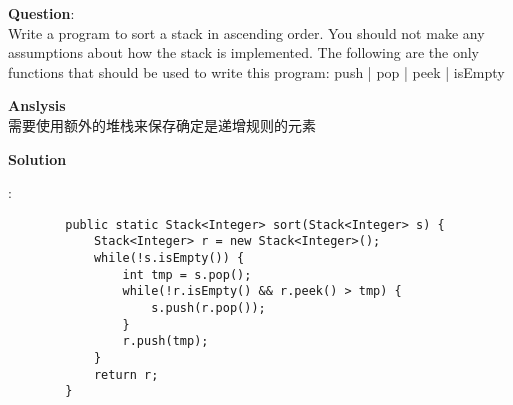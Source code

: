     
\begin{description}
    \item{\textbf{Question}}:\\%
		Write a program to sort a stack in ascending order. You should not make any assumptions about how the stack is implemented. The following are the only functions that should be used to write this program: push | pop | peek | isEmpty

    \item{\textbf{Anslysis}}\\
		需要使用额外的堆栈来保存确定是递增规则的元素

    \item{\textbf{Solution}}\\
	\item{} : \\
		\begin{lstlisting}
		public static Stack<Integer> sort(Stack<Integer> s) {
			Stack<Integer> r = new Stack<Integer>();
			while(!s.isEmpty()) {
				int tmp = s.pop();
				while(!r.isEmpty() && r.peek() > tmp) {
					s.push(r.pop());
				}
				r.push(tmp);
			}
			return r;
		}
		\end{lstlisting}

\end{description}

